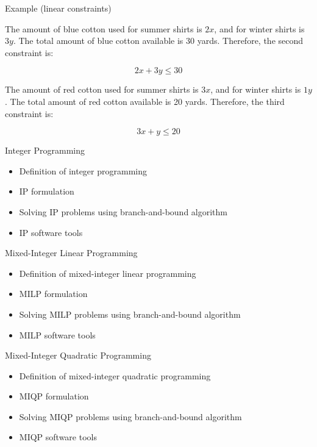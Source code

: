 \documentclass{beamer}
\begin{document}
\begin{frame}{Example (linear constraints)}

    The amount of blue cotton used for summer shirts is $2x$, and for winter shirts is $3y$. The total amount of blue cotton available is 30 yards. Therefore, the second constraint is:

    \begin{equation}
        2x + 3y \leq 30
    \end{equation}

    The amount of red cotton used for summer shirts is $3x$, and for winter shirts is $1y$. The total amount of red cotton available is 20 yards. Therefore, the third constraint is:

    \begin{equation}
        3x + y \leq 20
    \end{equation}

\end{frame}

\begin{frame}{Integer Programming}
    \begin{itemize}
        \item Definition of integer programming
        \item IP formulation
        \item Solving IP problems using branch-and-bound algorithm
        \item IP software tools
    \end{itemize}
\end{frame}

\begin{frame}{Mixed-Integer Linear Programming}
    \begin{itemize}
        \item Definition of mixed-integer linear programming
        \item MILP formulation
        \item Solving MILP problems using branch-and-bound algorithm
        \item MILP software tools
    \end{itemize}
\end{frame}

\begin{frame}{Mixed-Integer Quadratic Programming}
    \begin{itemize}
        \item Definition of mixed-integer quadratic programming
        \item MIQP formulation
        \item Solving MIQP problems using branch-and-bound algorithm
        \item MIQP software tools
    \end{itemize}
\end{frame}
\end{document}

